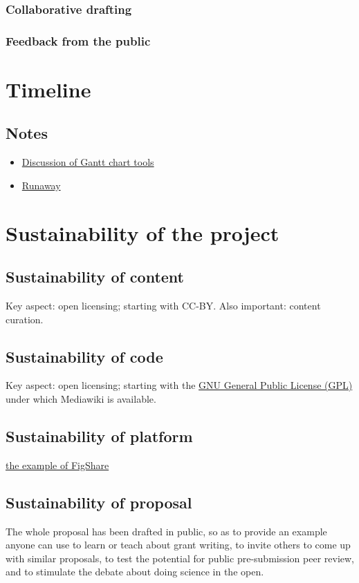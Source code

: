 \documentclass[final,authoryear,3p]{elsarticle-open-drafting}
\begin{document}
\subsubsection{Collaborative drafting}
\subsubsection{Feedback from the public}

\section{Timeline}

\subsection{Notes}
\begin{itemize}
	\item \href{http://ff.im/D6rQ0}{Discussion of Gantt chart tools}
	\item \href{http://openscience.runwaypm.com}{Runaway}
\end{itemize}

\section{Sustainability of the project}
\subsection{Sustainability of content}
Key aspect: open licensing; starting with CC-BY.
Also important: content curation.

\subsection{Sustainability of code}
Key aspect: open licensing; starting with the \href{http://www.gnu.org/licenses/gpl.html}{GNU General Public License (GPL)} under which Mediawiki is available.

\subsection{Sustainability of platform}
\href{http://www.pawelszczesny.org/2011/03/02/systems-institute-is-officially-supporting-figshare-backstage-story/}{the example of FigShare}

\subsection{Sustainability of proposal}
The whole proposal has been drafted in public, so as to provide an example anyone can use 
to learn or teach about grant writing, to invite others to come up with similar proposals, to test the potential for public pre-submission peer review, and to stimulate the debate about doing science in the open.
\end{document}

